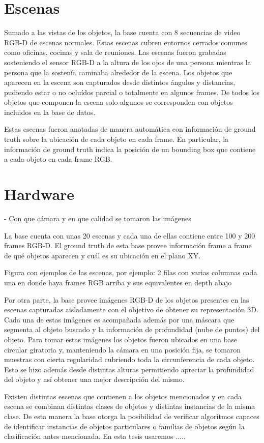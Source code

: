 \section{Escenas}
Sumado a las vistas de los objetos, la base cuenta con 8 secuencias de video RGB-D de escenas normales. Estas escenas cubren entornos cerrados comunes como oficinas, cocinas y sala de reuniones. Las escenas fueron grabadas sosteniendo el sensor RGB-D a la altura de los ojos de una persona mientras la persona que la sostenía caminaba alrededor de la escena. Los objetos que aparecen en la escena son capturados desde distintos ángulos y distancias, pudiendo estar o no ocluídos parcial o totalmente en algunos frames. De todos los objetos que componen la escena solo algunos se corresponden con objetos incluidos en la base de datos.

Estas escenas fueron anotadas de manera automática con información de ground truth sobre la ubicación de cada objeto en cada frame. En particular, la información de ground truth indica la posición de un bounding box que contiene a cada objeto en cada frame RGB.

\section{Hardware}
- Con que cámara y en que calidad se tomaron las imágenes


La base cuenta con unas 20 escenas y cada una de ellas contiene entre 100 y 200 frames RGB-D. El ground truth de esta base provee información frame a frame de qué objetos aparecen y cuál es su ubicación en el plano XY.

{\huge Figura con ejemplos de las escenas, por ejemplo: 2 filas con varias columnas cada una en donde haya frames RGB arriba y sus equivalentes en depth abajo}



Por otra parte, la base provee imágenes RGB-D de los objetos presentes en las escenas capturadas aisladamente con el objetivo de obtener su representación 3D. Cada una de estas imágenes es acompañada además por una máscara que segmenta al objeto buscado y la información de profundidad (nube de puntos) del objeto. Para tomar estas imágenes los objetos fueron ubicados en una base circular giratoria y, manteniendo la cámara en una posición fija, se tomaron muestras con cierta regularidad cubriendo toda la circunferencia de cada objeto. Esto se hizo además desde distintas alturas permitiendo apreciar la profundidad del objeto y así obtener una mejor descripción del mismo.


Existen distintas escenas que contienen a los objetos mencionados y en cada escena se combinan distintas clases de objetos y distintas instancias de la misma clase. De esta manera la base otorga la posibilidad de verificar algoritmos capaces de identificar instancias de objetos particulares o familias de objetos según la clasificación antes mencionada. En esta tesis usaremos .....
